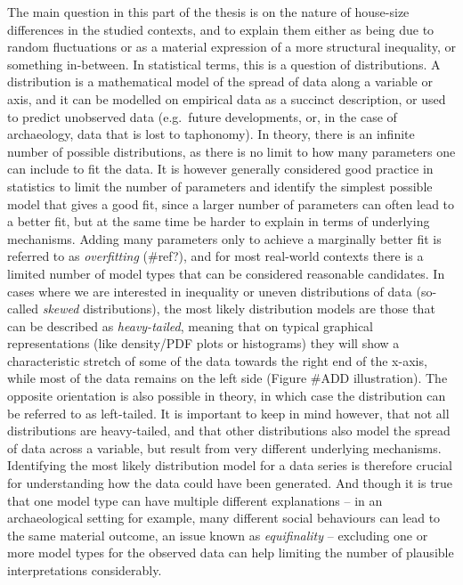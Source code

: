 \documentclass[
  12pt,
]{book}
\begin{document}
The main question in this part of the thesis is on the nature of house-size differences in the studied contexts, and to explain them either as being due to random fluctuations or as a material expression of a more structural inequality, or something in-between. In statistical terms, this is a question of distributions. A distribution is a mathematical model of the spread of data along a variable or axis, and it can be modelled on empirical data as a succinct description, or used to predict unobserved data (e.g.~future developments, or, in the case of archaeology, data that is lost to taphonomy). In theory, there is an infinite number of possible distributions, as there is no limit to how many parameters one can include to fit the data. It is however generally considered good practice in statistics to limit the number of parameters and identify the simplest possible model that gives a good fit, since a larger number of parameters can often lead to a better fit, but at the same time be harder to explain in terms of underlying mechanisms. Adding many parameters only to achieve a marginally better fit is referred to as \emph{overfitting} (\#ref?), and for most real-world contexts there is a limited number of model types that can be considered reasonable candidates. In cases where we are interested in inequality or uneven distributions of data (so-called \emph{skewed} distributions), the most likely distribution models are those that can be described as \emph{heavy-tailed}, meaning that on typical graphical representations (like density/PDF plots or histograms) they will show a characteristic stretch of some of the data towards the right end of the x-axis, while most of the data remains on the left side (Figure \#ADD illustration). The opposite orientation is also possible in theory, in which case the distribution can be referred to as left-tailed. It is important to keep in mind however, that not all distributions are heavy-tailed, and that other distributions also model the spread of data across a variable, but result from very different underlying mechanisms. Identifying the most likely distribution model for a data series is therefore crucial for understanding how the data could have been generated. And though it is true that one model type can have multiple different explanations -- in an archaeological setting for example, many different social behaviours can lead to the same material outcome, an issue known as \emph{equifinality} -- excluding one or more model types for the observed data can help limiting the number of plausible interpretations considerably.
\end{document}
